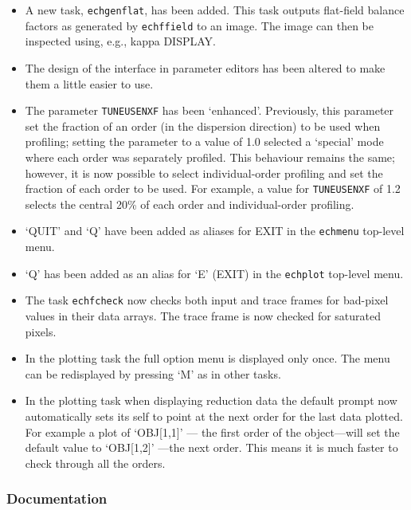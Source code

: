 \documentclass[twoside,11pt]{article}
\newcommand{\htmlref}[2]{#1}
\newcommand{\xref}[3]{#1}
\renewcommand{\_}{\texttt{\symbol{95}}}
\begin{document}
\begin{itemize}
 \item A new task, \htmlref{{\tt{ech\_genflat}}}{ech_genflat},
   has been added.  This task outputs flat-field
   balance factors as generated by \htmlref{{\tt{ech\_ffield}}}{ech_ffield}
   to an image.  The image
   can then be inspected using, e.g., \xref{{\sc kappa}}{sun95}{}
   \xref{DISPLAY}{sun95}{DISPLAY}.
\item The design of the interface in parameter editors has been altered
   to make them a little easier to use.
\item The parameter \htmlref{{\tt{TUNE\_USE\_NXF}}}{par_TUNE_USE_NXF}
   has been `enhanced'.  Previously, this
   parameter set the fraction of an order (in the dispersion direction)
   to be used when profiling; setting the parameter to a value of 1.0
   selected a `special' mode where each order was separately profiled.
   This behaviour remains the same; however, it is now possible to
   select individual-order profiling and set the fraction of each order
   to be used.  For example, a value for {\tt TUNE\_USE\_NXF} of 1.2 selects
   the central 20\% of each order and individual-order profiling.
\item `QUIT' and `Q' have been added as aliases for EXIT in the \texttt{echmenu}
   top-level menu.
\item `Q' has been added as an alias for `E' (EXIT) in the
   \htmlref{{\tt{ech\_plot}}}{ech_plot} top-level menu.
\item The task \htmlref{{\tt{ech\_fcheck}}}{ech_fcheck} now checks both
   input and trace frames for
   bad-pixel values in their data arrays.  The trace frame is now
   checked for saturated pixels.
\item In the plotting task the full option menu is displayed only once.
   The menu can be redisplayed by pressing `M' as in other tasks.
\item In the plotting task when displaying reduction data the default
   prompt now automatically sets its self to point at the next order
   for the last data plotted.  For example a plot of `OBJ[1,1]' --- the
   first order of the object---will set the default value to `OBJ[1,2]'
   ---the next order.  This means it is much faster to check through all
   the orders.
\end{itemize}

\subsubsection{Documentation}
\end{document}
